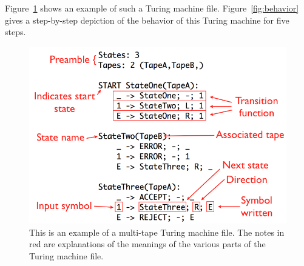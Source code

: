 \documentclass[11pt]{report}
\begin{document}
Figure~\ref{fig:tmexample} shows an example of such a Turing machine file. Figure~\ref{fig:behavior} gives a step-by-step depiction of the behavior of this Turing machine for five steps. \\

\begin{figure} 
\begin{center} 
\includegraphics[scale=0.4]{figs/annotatedtm.png} 
\caption{This is an example of a multi-tape Turing machine file. The notes in red are explanations of the meanings of the various parts of the Turing machine file. \label{fig:tmexample}} 
\end{center} 
\end{figure}
\end{document}
